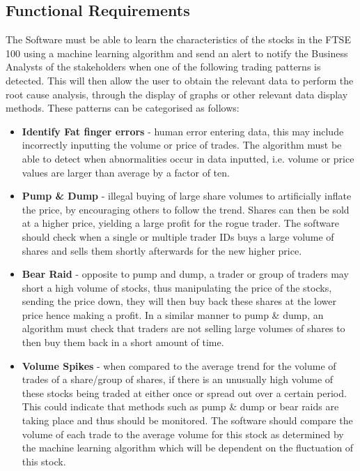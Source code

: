 \documentclass[11pt, oneside, a4paper]{article}
\begin{document}
\subsection{Functional Requirements}
The Software must be able to learn the characteristics of the stocks in the FTSE 100 using a machine learning
algorithm and send an alert to notify the Business Analysts of the stakeholders when one of the following
trading patterns is detected. This will then allow the user to obtain the relevant data to perform the root
cause analysis, through the display of graphs or other relevant data display methods. These patterns can be
categorised as follows:
\begin{itemize}
	\item \textbf{Identify Fat finger errors} - human error entering data, this may include incorrectly inputting
	the volume or price of trades. The algorithm must be able to detect when abnormalities occur in data inputted,
	i.e. volume or price values are larger than average by a factor of ten.
	\item \textbf{Pump \& Dump} - illegal buying of large share volumes to artificially inflate the price, by
	encouraging others to follow the trend. Shares can then be sold at a higher price, yielding a large profit
	for the rogue trader. The software should check when a single or multiple trader IDs buys a large volume of
	shares and sells them shortly afterwards for the new higher price.
	\item \textbf{Bear Raid} - opposite to pump and dump, a trader or group of traders may short a high volume
	of stocks, thus manipulating the price of the stocks, sending the price down, they will then buy back these
	shares at the lower price hence making a profit. In a similar manner to pump \& dump, an algorithm must check
	that traders are not selling large volumes of shares to then buy them back in a short amount of time.
	\item \textbf{Volume Spikes} - when compared to the average trend for the volume of trades of a share/group
	of shares, if there is an unusually high volume of these stocks being traded at either once or spread out
	over a certain period. This could indicate that methods such as pump \& dump or bear raids are taking place
	and thus should be monitored. The software should compare the volume of each trade to the average volume for
	this stock as determined by the machine learning algorithm which will be dependent on the fluctuation of this stock.
\end{itemize}
\end{document}
